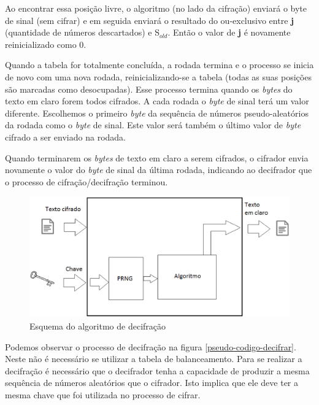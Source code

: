 Ao encontrar essa posição livre, o algoritmo (no lado da cifração) enviará o byte de sinal (sem cifrar) e em seguida enviará o resultado do ou-exclusivo entre \textbf{j} (quantidade de números descartados) e S$_{old}$. Então o valor de \textbf{j} é novamente reinicializado como 0.

Quando a tabela for totalmente concluída, a rodada termina e o processo se inicia de novo com uma nova rodada, reinicializando-se a tabela (todas as suas posições são marcadas como desocupadas). Esse processo termina quando os \textit{bytes} do texto em claro forem todos cifrados. A cada rodada o \textit{byte} de sinal terá um valor diferente. Escolhemos o primeiro \textit{byte} da sequência de números pseudo-aleatórios da rodada como o \textit{byte} de sinal. Este valor será também o último valor de \textit{byte} cifrado a ser enviado na rodada.

Quando terminarem os \textit{bytes} de texto em claro a serem cifrados, o cifrador envia novamente o valor do \textit{byte} de sinal da última rodada, indicando ao decifrador que o processo de cifração/decifração terminou.

\begin{figure}[h]
	\centering
	\includegraphics[scale=0.6]{figuras/metodo_de_decifra.eps}
	\caption{Esquema do algoritmo de decifração}
\end{figure}

Podemos observar o processo de decifração na figura \ref{pseudo-codigo-decifrar}. Neste não é necessário se utilizar a tabela de balanceamento. Para se realizar a decifração é necessário que o decifrador tenha a capacidade de produzir a mesma sequência de números aleatórios que o cifrador. Isto implica que ele deve ter a mesma chave que foi utilizada no processo de cifrar.


